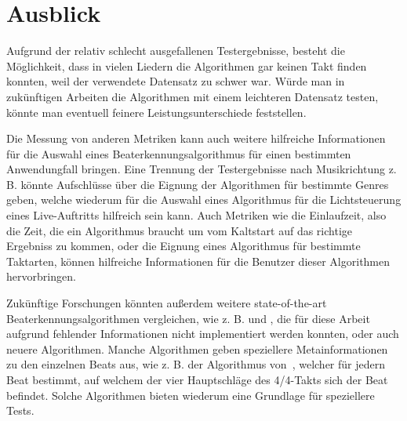 \section{Ausblick}
{
	Aufgrund der relativ schlecht ausgefallenen Testergebnisse,
		besteht die Möglichkeit,
		dass in vielen Liedern die Algorithmen gar keinen Takt finden konnten,
		weil der verwendete Datensatz zu schwer war.
	Würde man in zukünftigen Arbeiten die Algorithmen mit einem leichteren Datensatz testen,
		könnte man eventuell feinere Leistungsunterschiede feststellen.

	Die Messung von anderen Metriken kann auch weitere hilfreiche Informationen für die Auswahl eines Beaterkennungsalgorithmus für einen bestimmten Anwendungfall bringen.
	Eine Trennung der Testergebnisse nach Musikrichtung z. B. könnte Aufschlüsse über die Eignung der Algorithmen für bestimmte Genres geben,
		welche wiederum für die Auswahl eines Algorithmus für die Lichtsteuerung eines Live-Auftritts hilfreich sein kann.
	Auch Metriken wie die Einlaufzeit,
		also die Zeit,
		die ein Algorithmus braucht um vom Kaltstart auf das richtige Ergebniss zu kommen,
		oder die Eignung eines Algorithmus für bestimmte Taktarten,
		können hilfreiche Informationen für die Benutzer dieser Algorithmen hervorbringen.

	Zukünftige Forschungen könnten au{\ss}erdem weitere state-of-the-art Beaterkennungsalgorithmen vergleichen,
		wie z. B. \cite{2000_Di} und \cite{2001_Go},
		die für diese Arbeit aufgrund fehlender Informationen nicht implementiert werden konnten,
		oder auch neuere Algorithmen.
	Manche Algorithmen geben speziellere Metainformationen zu den einzelnen Beats aus,
		wie z. B. der Algorithmus von~\cite{2001_Go},
		welcher für jedern Beat bestimmt,
		auf welchem der vier Hauptschläge des 4/4-Takts sich der Beat befindet.
	Solche Algorithmen bieten wiederum eine Grundlage für speziellere Tests.
}
